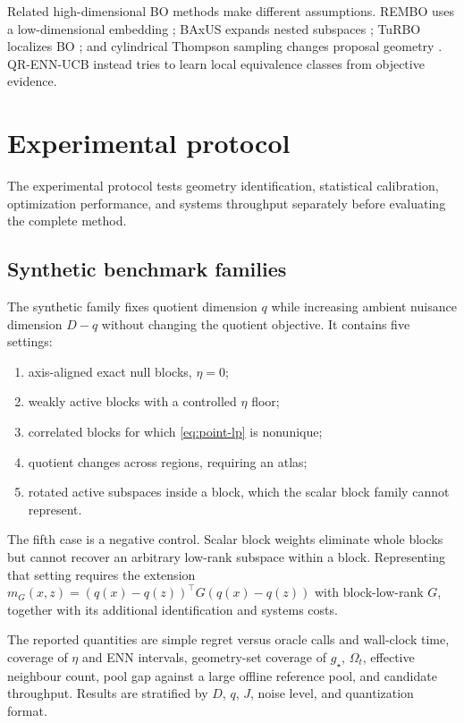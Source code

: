\documentclass[11pt]{article}
\theoremstyle{definition}
\theoremstyle{remark}
\newcommand{\1}{\mathbf 1}
\begin{document}
Related high-dimensional BO methods make different assumptions.  REMBO uses a
low-dimensional embedding \cite{REMBO}; BAxUS expands nested subspaces \cite{BAxUS}; TuRBO
localizes BO \cite{TuRBO}; and cylindrical Thompson sampling changes proposal geometry
\cite{CylTS}.  QR-ENN-UCB instead tries to learn local equivalence classes from objective evidence.

\section{Experimental protocol}\label{sec:experiments}

The experimental protocol tests geometry identification, statistical calibration, optimization
performance, and systems throughput separately before evaluating the complete method.

\subsection{Synthetic benchmark families}

The synthetic family fixes quotient dimension $q$ while increasing ambient nuisance dimension $D-q$
without changing the quotient objective.  It contains five settings:
\begin{enumerate}
\item axis-aligned exact null blocks, $\eta=0$;
\item weakly active blocks with a controlled $\eta$ floor;
\item correlated blocks for which \eqref{eq:point-lp} is nonunique;
\item quotient changes across regions, requiring an atlas;
\item rotated active subspaces inside a block, which the scalar block family cannot represent.
\end{enumerate}
The fifth case is a negative control.  Scalar block weights eliminate whole blocks but cannot
recover an arbitrary low-rank subspace within a block.  Representing that setting requires the
extension $m_G(x,z)=(q(x)-q(z))^\top G(q(x)-q(z))$ with block-low-rank $G$, together with its
additional identification and systems costs.

The reported quantities are simple regret versus oracle calls and wall-clock time, coverage of
$\eta$ and ENN intervals, geometry-set coverage of $g_\star$, $\Omega_t$, effective neighbour
count, pool gap against a large offline reference pool, and candidate throughput.  Results are
stratified by $D$, $q$, $J$, noise level, and quantization format.
\end{document}
